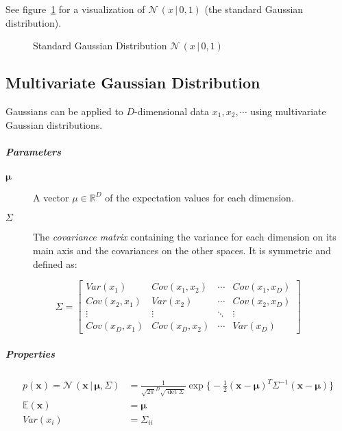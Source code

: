 \documentclass[a4paper, 11pt, accentcolor = tud3b]{tudreport}
\newcommand{\E}{\ensuremath{\mathbb{E}}}
\newcommand{\Cov}{\ensuremath{\textit{Cov}}}
\newcommand{\given}{\ensuremath{\,\vert\,}}
\newcommand{\R}{\ensuremath{\mathbb{R}}}
\newcommand{\Var}{\ensuremath{\textit{Var}}}
\renewcommand{\vec}[1]{\mathbf{#1}}
\begin{document}
					See figure~\ref{fig:gaussianDistribution} for a visualization of \( \mathcal{N}\,(x \given 0, 1) \) (the standard Gaussian distribution).

					\begin{figure}
						\centering
						\caption{Standard Gaussian Distribution \( \mathcal{N}\,(x \given 0, 1) \)}
						\label{fig:gaussianDistribution}
					\end{figure}

			\subsection{Multivariate Gaussian Distribution}
				Gaussians can be applied to \(D\)-dimensional data \(x_1, x_2, \cdots\) using multivariate Gaussian distributions.

				\subparagraph{Parameters}
				\begin{description}
					\item[\(\vec{\mu}\)] A vector \( \mu \in \R^D \) of the expectation values for each dimension.
					\item[\(\Sigma\)] The \emph{covariance matrix} containing the variance for each dimension on its main axis and the covariances on the other spaces. It is symmetric and defined as:
				\end{description}
				\begin{equation}
					\Sigma =
						\begin{bmatrix}
							\Var(x_1)      & \Cov(x_1, x_2) & \cdots & \Cov(x_1, x_D) \\
							\Cov(x_2, x_1) & \Var(x_2)      & \cdots & \Cov(x_2, x_D) \\
							\vdots         & \vdots         & \ddots & \vdots         \\
							\Cov(x_D, x_1) & \Cov(x_D, x_2) & \cdots & \Var(x_D)
						\end{bmatrix}
				\end{equation}

				\subparagraph{Properties}
				\begin{align}
					p(\vec{x}) = \mathcal{N}\,(\vec{x} \given \vec{\mu}, \Sigma) & = \frac{1}{\sqrt{2\pi}^D \sqrt{\det \Sigma}} \exp\Bigg\{ -\frac{1}{2} (\vec{x} - \vec{\mu})^T \Sigma^{-1} (\vec{x} - \vec{\mu}) \Bigg\} \\
					\E(\vec{x})                                                & = \vec{\mu}                                                                                                                             \\
					\Var(x_i)                                                  & = \Sigma_{ii}
				\end{align}
\end{document}
